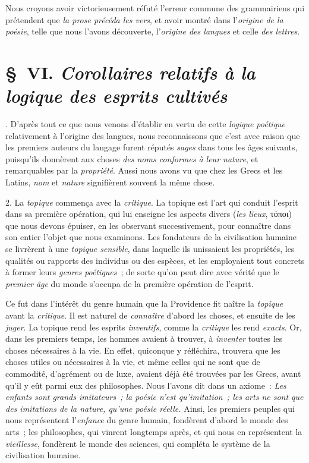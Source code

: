 \documentclass[french,twoside]{book} %
\begin{document}
 Nous croyons avoir victorieusement réfuté l’erreur commune des grammairiens qui prétendent que {\itshape la prose précéda les vers}, et avoir montré dans l’{\itshape origine de la poésie}, telle que nous l’avons découverte, l’{\itshape origine des langues} et celle {\itshape des lettres}.
\section[{§ VI. Corollaires relatifs à la logique des esprits cultivés}]{§ VI. {\itshape Corollaires relatifs à la logique des esprits cultivés}}
. D’après tout ce que nous venons d’établir en vertu de cette {\itshape logique poétique} relativement à l’origine des langues, nous reconnaissons que c’est avec raison que les premiers auteurs du langage furent réputés {\itshape sages} dans tous les âges suivants, puisqu’ils donnèrent aux choses {\itshape des noms conformes à leur nature}, et remarquables par la {\itshape propriété}. Aussi nous avons vu que chez les Grecs et les Latins, {\itshape nom} et {\itshape nature} signifièrent souvent la même chose.\par
2. La {\itshape topique} commença avec la {\itshape critique}. La topique est l’art qui conduit l’esprit dans sa première opération, qui lui enseigne les aspects divers ({\itshape les lieux}, τόποι) que nous devons épuiser, en les observant successivement, pour connaître dans son entier l’objet que nous examinons. Les fondateurs  de la civilisation humaine se livrèrent à une {\itshape topique sensible}, dans laquelle ils unissaient les propriétés, les qualités ou rapports des individus ou des espèces, et les employaient tout concrets à former leurs {\itshape genres poétiques} ; de sorte qu’on peut dire avec vérité que le {\itshape premier âge} du monde s’occupa de la première opération de l’esprit.\par
Ce fut dans l’intérêt du genre humain que la Providence fit naître la {\itshape topique} avant la {\itshape critique}. Il est naturel de {\itshape connaître} d’abord les choses, et ensuite de les {\itshape juger}. La topique rend les esprits {\itshape inventifs}, comme la {\itshape critique} les rend {\itshape exacts}. Or, dans les premiers temps, les hommes avaient à trouver, à {\itshape inventer} toutes les choses nécessaires à la vie. En effet, quiconque y réfléchira, trouvera que les choses utiles ou nécessaires à la vie, et même celles qui ne sont que de commodité, d’agrément ou de luxe, avaient déjà été trouvées par les Grecs, avant qu’il y eût parmi eux des philosophes. Nous l’avons dit dans un axiome : {\itshape Les enfants sont grands imitateurs ; la poésie n’est qu’imitation ; les arts ne sont que des imitations de la nature, qu’une poésie réelle.} Ainsi, les premiers peuples qui nous représentent l’{\itshape enfance} du genre humain, fondèrent d’abord le monde des arts ; les philosophes, qui vinrent longtemps après, et qui nous en représentent la {\itshape vieillesse}, fondèrent le monde des sciences, qui compléta le système de la civilisation humaine.\par
\end{document}
